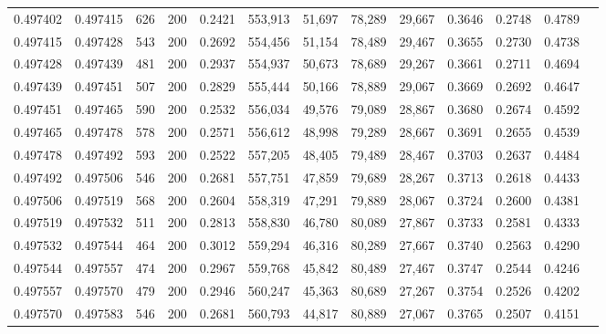 \begin{tabular}{rrrrrrrrrrrrr}
0.497402 & 0.497415 &   626 & 200 &                                     0.2421 & 553,913 &  51,697 &  78,289 &  29,667 & 0.3646 & 0.2748 & 0.4789 \\
0.497415 & 0.497428 &   543 & 200 &                                     0.2692 & 554,456 &  51,154 &  78,489 &  29,467 & 0.3655 & 0.2730 & 0.4738 \\
0.497428 & 0.497439 &   481 & 200 &                                     0.2937 & 554,937 &  50,673 &  78,689 &  29,267 & 0.3661 & 0.2711 & 0.4694 \\
0.497439 & 0.497451 &   507 & 200 &                                     0.2829 & 555,444 &  50,166 &  78,889 &  29,067 & 0.3669 & 0.2692 & 0.4647 \\
0.497451 & 0.497465 &   590 & 200 &                                     0.2532 & 556,034 &  49,576 &  79,089 &  28,867 & 0.3680 & 0.2674 & 0.4592 \\
0.497465 & 0.497478 &   578 & 200 &                                     0.2571 & 556,612 &  48,998 &  79,289 &  28,667 & 0.3691 & 0.2655 & 0.4539 \\
0.497478 & 0.497492 &   593 & 200 &                                     0.2522 & 557,205 &  48,405 &  79,489 &  28,467 & 0.3703 & 0.2637 & 0.4484 \\
0.497492 & 0.497506 &   546 & 200 &                                     0.2681 & 557,751 &  47,859 &  79,689 &  28,267 & 0.3713 & 0.2618 & 0.4433 \\
0.497506 & 0.497519 &   568 & 200 &                                     0.2604 & 558,319 &  47,291 &  79,889 &  28,067 & 0.3724 & 0.2600 & 0.4381 \\
0.497519 & 0.497532 &   511 & 200 &                                     0.2813 & 558,830 &  46,780 &  80,089 &  27,867 & 0.3733 & 0.2581 & 0.4333 \\
0.497532 & 0.497544 &   464 & 200 &                                     0.3012 & 559,294 &  46,316 &  80,289 &  27,667 & 0.3740 & 0.2563 & 0.4290 \\
0.497544 & 0.497557 &   474 & 200 &                                     0.2967 & 559,768 &  45,842 &  80,489 &  27,467 & 0.3747 & 0.2544 & 0.4246 \\
0.497557 & 0.497570 &   479 & 200 &                                     0.2946 & 560,247 &  45,363 &  80,689 &  27,267 & 0.3754 & 0.2526 & 0.4202 \\
0.497570 & 0.497583 &   546 & 200 &                                     0.2681 & 560,793 &  44,817 &  80,889 &  27,067 & 0.3765 & 0.2507 & 0.4151 \\

\end{tabular}
